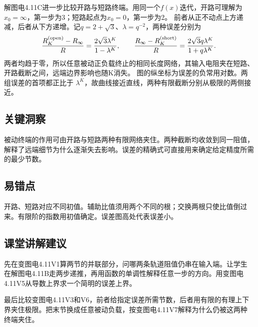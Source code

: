 \documentclass[UTF8,fontset=fandol,a4paper,11pt]{ctexart}
\begin{document}
解图电4.11C进一步比较开路与短路终端。用同一个$f(x)$迭代，开路可理解为$x_0=\infty$，第一步为3；短路起点为$x_0=0$，第一步为2。
前者从正不动点上方递减，后者从下方递增。记$q=2+\sqrt3$、$\lambda=q^{-2}$，两种误差分别为
\[
\frac{R_K^{(\rm open)}-R_\infty}{R}=\frac{2\sqrt3\lambda^K}{1-\lambda^K},\qquad
\frac{R_\infty-R_K^{(\rm short)}}R=\frac{2\sqrt3q\lambda^K}{1+q\lambda^K}.
\]
两者均趋于零，所以任意被动正负载终止的相同长度网络，其输入电阻夹在短路、开路截断之间，远端边界影响也随K消失。
图的纵坐标为误差的负常用对数。两组误差的首项都正比于 $\lambda^K$，故曲线接近直线，两种有限截断分别从极限的两侧接近。




\subsection*{关键洞察}

被动终端的作用可由开路与短路两种有限网络夹住。两种截断均收敛到同一阻值，解释了远端细节为什么逐渐失去影响。误差的精确式可直接用来确定给定精度所需的最少节数。



\subsection*{易错点}

开路、短路对应不同初值。辅助比值须用两个不同的根；交换两根只使比值倒过来。有限阶的指数用初值确定。误差图高处代表误差小。



\subsection*{课堂讲解建议}

先在变图电4.11V1算两节的并联部分，问哪两条轨道阻值仍串在输入端。让学生在解图电4.11B走两步递推，再用函数的单调性解释任意一步的方向。用变图电4.11V5从导数上界求一个简明的误差上界。

最后比较变图电4.11V3和V6，前者给指定误差所需节数，后者用有限的有理上下界夹住极限。把末节换成任意被动负载，按变图电4.11V7解释为什么仍被这两种终端夹住。

\end{document}
